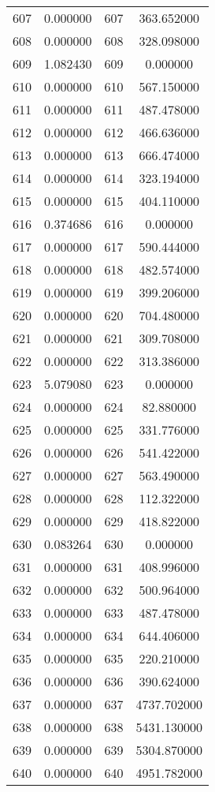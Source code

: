 \documentclass[12pt]{article}
\begin{document}
\begin{longtable}{@{}cccc@{}}
607 & 0.000000 & 607 & 363.652000 \\
608 & 0.000000 & 608 & 328.098000 \\
609 & 1.082430 & 609 & 0.000000 \\
610 & 0.000000 & 610 & 567.150000 \\
611 & 0.000000 & 611 & 487.478000 \\
612 & 0.000000 & 612 & 466.636000 \\
613 & 0.000000 & 613 & 666.474000 \\
614 & 0.000000 & 614 & 323.194000 \\
615 & 0.000000 & 615 & 404.110000 \\
616 & 0.374686 & 616 & 0.000000 \\
617 & 0.000000 & 617 & 590.444000 \\
618 & 0.000000 & 618 & 482.574000 \\
619 & 0.000000 & 619 & 399.206000 \\
620 & 0.000000 & 620 & 704.480000 \\
621 & 0.000000 & 621 & 309.708000 \\
622 & 0.000000 & 622 & 313.386000 \\
623 & 5.079080 & 623 & 0.000000 \\
624 & 0.000000 & 624 & 82.880000 \\
625 & 0.000000 & 625 & 331.776000 \\
626 & 0.000000 & 626 & 541.422000 \\
627 & 0.000000 & 627 & 563.490000 \\
628 & 0.000000 & 628 & 112.322000 \\
629 & 0.000000 & 629 & 418.822000 \\
630 & 0.083264 & 630 & 0.000000 \\
631 & 0.000000 & 631 & 408.996000 \\
632 & 0.000000 & 632 & 500.964000 \\
633 & 0.000000 & 633 & 487.478000 \\
634 & 0.000000 & 634 & 644.406000 \\
635 & 0.000000 & 635 & 220.210000 \\
636 & 0.000000 & 636 & 390.624000 \\
637 & 0.000000 & 637 & 4737.702000 \\
638 & 0.000000 & 638 & 5431.130000 \\
639 & 0.000000 & 639 & 5304.870000 \\
640 & 0.000000 & 640 & 4951.782000 \\

\end{longtable}
\end{document}
